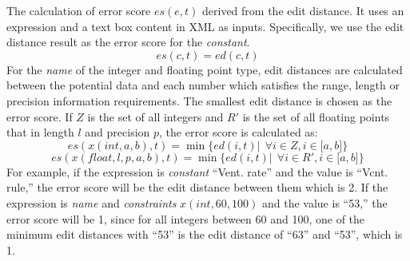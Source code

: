 The calculation of error score $es(e, t)$ derived from the edit
distance. It uses an expression and a text box content in XML as inputs.
Specifically, we use the edit distance result as
the error score for the {\em constant}.
\begin{equation}
es(c, t) = ed(c, t)
\end{equation}
For the {\em name} of the integer and floating point type,
edit distances are calculated between the potential data and each number
which satisfies the range, length or precision information requirements.
The smallest edit distance is chosen as the error score.
If $Z$ is the set of all integers and $R'$ is the set of
all floating points that in length $l$ and precision $p$,
the error score is calculated as:
\begin{equation}
es(x(int, a, b), t)=\min\{ed(i, t)| ~~\forall i \in Z, i \in \lbrack a, b \rbrack\}
\end{equation}
\begin{equation}
es(x(float, l, p, a, b), t)=\min\{ed(i, t)| ~~\forall i \in R', i \in \lbrack a, b \rbrack\}
\end{equation}
For example, if the expression is {\em constant} ``Vent. rate'' and
the value is ``Vcnt. rule,''
the error score will be the edit distance between them which is 2.
If the expression is {\em name} and {\em constraints} $x(int, 60, 100)$
and the value is ``53,'' the error score will be 1, since for all integers
between 60 and 100, one of the minimum edit distances with ``53'' is
the edit distance of ``63'' and ``53'', which is 1.

